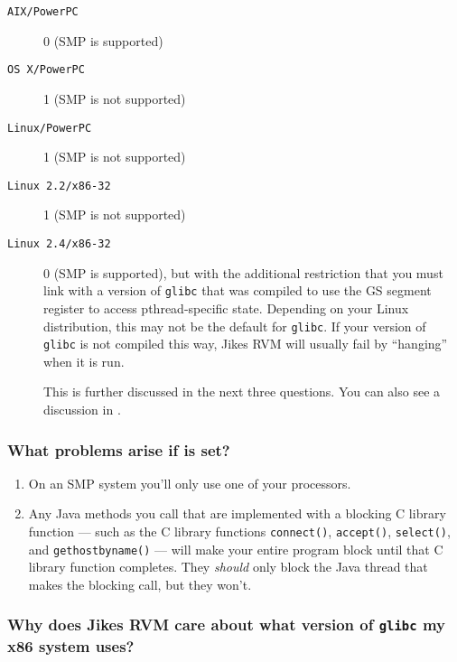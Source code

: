 \begin{description}

\item[{\tt AIX/PowerPC}] 0 (SMP is supported)

\item[{\tt OS~X/PowerPC}]  1 (SMP is not supported)

\item[{\tt Linux/PowerPC}]  1 (SMP is not supported)

\item[{\tt Linux 2.2/x86-32}] 1 (SMP is not supported)

\item[{\tt Linux 2.4/x86-32}] 0 (SMP is supported), but with the
additional restriction that you must link with a version of \texttt{glibc} that
was compiled to use the GS segment register to access pthread-specific
state.  Depending on your Linux\Rweb{} distribution, this may not be the
default for \texttt{glibc}.  If your version of \texttt{glibc}
is not compiled this way, Jikes RVM will usually fail by ``hanging'' when
it is run.

This is further discussed in the next three
questions.  You can also see a discussion in . 

\end{description}                

\subsubsection{What problems arise if
 is set?}%
\label{singleVirtualProcessorProblems}
\begin{enumerate}
\item On an SMP system you'll only use one of your processors.
\item Any Java methods you call that are implemented with a blocking C
  library function --- such as the C library functions
  \texttt{connect()}, \texttt{accept()}, \texttt{select()}, and
  \texttt{gethostbyname()} --- will make your entire program block
  until that C library function completes.  They \textit{should} only
  block the Java thread that makes the blocking call, but they won't.
\end{enumerate}

\subsubsection{Why does Jikes RVM care about what version of \texttt{glibc} my x86 system uses?}

